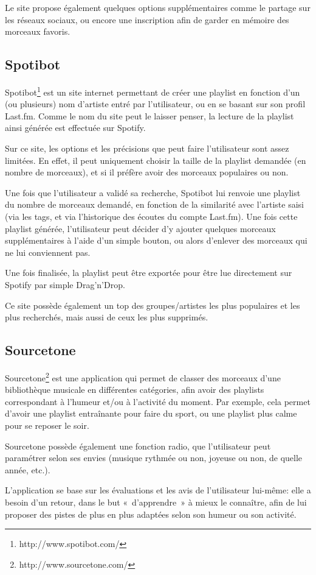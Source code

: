 Le site propose également quelques options supplémentaires comme le partage 
sur les réseaux sociaux, ou encore une inscription afin de garder en mémoire 
des morceaux favoris.

\subsection{Spotibot}
\label{existant:generateurs:spotibot}

Spotibot\footnote{http://www.spotibot.com/} est un site internet permettant de 
créer une playlist en fonction d'un (ou plusieurs) nom d'artiste entré par l'utilisateur,
 ou en se basant sur son profil Last.fm. Comme le nom du 
site peut le laisser penser, la lecture de la playlist ainsi générée est 
effectuée sur Spotify.

Sur ce site, les options et les précisions que peut faire l'utilisateur sont 
assez limitées. En effet, il peut uniquement choisir la taille de la 
playlist demandée (en nombre de morceaux), et si il préfère avoir des 
morceaux populaires ou non.

Une fois que l'utilisateur a validé sa recherche, Spotibot lui renvoie une 
playlist du nombre de morceaux demandé, en fonction de la similarité avec 
l'artiste saisi (via les tags, et via l'historique des écoutes du compte 
Last.fm). Une fois cette playlist générée, l'utilisateur peut décider d'y 
ajouter quelques morceaux supplémentaires à l'aide d'un simple bouton, ou 
alors d'enlever des morceaux qui ne lui conviennent pas.

Une fois finalisée, la playlist peut être exportée pour être lue directement 
sur Spotify par simple Drag'n'Drop.

Ce site possède également un top des groupes/artistes les plus populaires et 
les plus recherchés, mais aussi de ceux les plus supprimés.

\subsection{Sourcetone}
\label{existant:generateurs:sourcetone}

Sourcetone\footnote{http://www.sourcetone.com/} est une application qui permet 
de classer des morceaux d'une bibliothèque musicale en différentes catégories, 
afin avoir des playlists correspondant à l'humeur et/ou à l'activité du moment. 
Par exemple, cela permet d'avoir une playlist entraînante pour faire du sport, 
ou une playlist plus calme pour se reposer le soir.

Sourcetone possède également une fonction radio, que l'utilisateur peut 
paramétrer selon ses envies (musique rythmée ou non, joyeuse ou non, de 
quelle année, etc.).

L'application se base sur les évaluations et les avis de l'utilisateur 
lui-même: elle a besoin d'un retour, dans le but «~d'apprendre~» à mieux le 
connaître, afin de lui proposer des pistes de plus en plus adaptées selon 
son humeur ou son activité.


